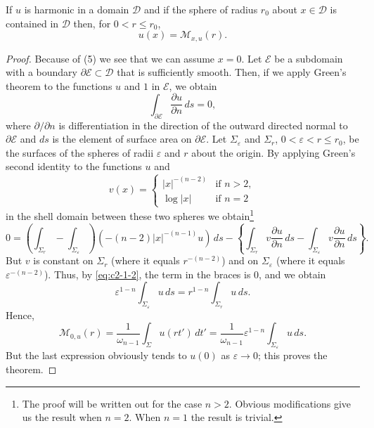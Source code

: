 \begin{theorem}\label{thm:c2-1-1}
If $u$ is harmonic in a domain $\mathcal{D}$ and if the sphere of radius $r_0$ about $x \in \mathcal{D}$ is contained in $\mathcal{D}$ then, for $0 < r \leq r_0$,
\[
u(x) = \mathcal{M}_{x,u}(r).
\]
\end{theorem}

\begin{proof}
Because of (5) we see that we can assume $x = 0$. Let $\mathcal{E}$ be a subdomain with a boundary $\partial\mathcal{E} \subset \mathcal{D}$ that is sufficiently smooth. Then, if we apply Green's theorem to the functions $u$ and $1$ in $\mathcal{E}$, we obtain
\begin{equation}\label{eq:c2-1-2}
\int_{\partial\mathcal{E}} \frac{\partial u}{\partial n}\,ds = 0,
\end{equation}
where $\partial/\partial n$ is differentiation in the direction of the outward directed normal to $\partial\mathcal{E}$ and $ds$ is the element of surface area on $\partial\mathcal{E}$. Let $\Sigma_\varepsilon$ and $\Sigma_r$, $0 < \varepsilon < r \leq r_0$, be the surfaces of the spheres of radii $\varepsilon$ and $r$ about the origin. By applying Green's second identity to the functions $u$ and
\[
v(x) = \begin{cases}
|x|^{-(n-2)} & \text{if } n > 2, \\
\log |x| & \text{if } n = 2
\end{cases}
\]
in the shell domain between these two spheres we obtain\footnote{The proof will be written out for the case $n > 2$. Obvious modifications give us the result when $n = 2$. When $n = 1$ the result is trivial.}
\[
0 = \left(\int_{\Sigma_r} - \int_{\Sigma_\varepsilon}\right) (-(n-2)|x|^{-(n-1)} u)\,ds - \left\{ \int_{\Sigma_r} v \frac{\partial u}{\partial n}\,ds - \int_{\Sigma_\varepsilon} v \frac{\partial u}{\partial n}\,ds \right\}.
\]
But $v$ is constant on $\Sigma_r$ (where it equals $r^{-(n-2)}$) and on $\Sigma_\varepsilon$ (where it equals $\varepsilon^{-(n-2)}$). Thus, by \eqref{eq:c2-1-2}, the term in the braces is $0$, and we obtain
\[
\varepsilon^{1-n} \int_{\Sigma_\varepsilon} u\,ds = r^{1-n} \int_{\Sigma_r} u\,ds.
\]
Hence,
\[
\mathcal{M}_{0,u}(r) = \frac{1}{\omega_{n-1}} \int_{\Sigma} u(rt')\,dt' = \frac{1}{\omega_{n-1}} \varepsilon^{1-n} \int_{\Sigma_\varepsilon} u\,ds.
\]
But the last expression obviously tends to $u(0)$ as $\varepsilon \to 0$; this proves the theorem.
\end{proof}

